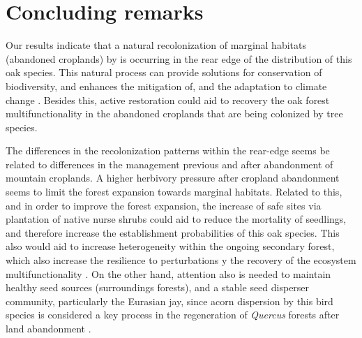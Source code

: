 \section{Concluding remarks}\label{sec:coloniza:Conclusion}
Our results indicate that a natural recolonization of marginal habitats (abandoned croplands) by \Qp is occurring in the rear edge of the distribution of this oak species. This natural process can provide solutions for conservation of biodiversity, and enhances the mitigation of, and the adaptation to climate change \autocites[][and references therein]{Chazdonetal2020FosteringNatural}. Besides this, active restoration could aid to recovery the oak forest multifunctionality \autocite{CruzAlonsoetal2019LongTerm} in the abandoned croplands that are being colonized by tree species. 

The differences in the recolonization patterns within the rear-edge seems be related to differences in the management previous and after abandonment of mountain croplands. A higher herbivory pressure after cropland abandonment seems to limit the forest expansion towards marginal habitats. Related to this, and in order to improve the forest expansion, the increase of safe sites via plantation of native nurse shrubs could aid to reduce the mortality of \Qp seedlings, and therefore increase the establishment probabilities of this oak species. This also would aid to increase heterogeneity within the ongoing secondary forest, which also increase the resilience to perturbations y the recovery of the ecosystem multifunctionality \autocites{Stritihetal2021ImpactLanduse, CruzAlonsoetal2019LongTerm}. On the other hand, attention also is needed to maintain healthy seed sources (surroundings forests), and a stable seed disperser community, particularly the Eurasian jay, since acorn dispersion by this bird species is considered a key process in the regeneration of \emph{Quercus} forests after land abandonment \autocite{Pausasetal2006RegenerationMarginal}. 
